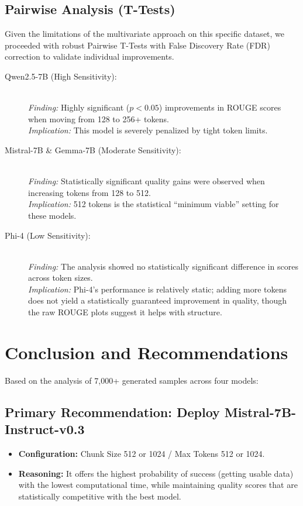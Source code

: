 \documentclass[12pt, a4paper]{article}
\begin{document}
\subsection{Pairwise Analysis (T-Tests)}
Given the limitations of the multivariate approach on this specific dataset, we proceeded with robust Pairwise T-Tests with False Discovery Rate (FDR) correction to validate individual improvements.

\begin{description}
    \item[Qwen2.5-7B (High Sensitivity):] \hfill \\
    \textit{Finding:} Highly significant ($p<0.05$) improvements in ROUGE scores when moving from 128 to 256+ tokens. \\
    \textit{Implication:} This model is severely penalized by tight token limits.

    \item[Mistral-7B \& Gemma-7B (Moderate Sensitivity):] \hfill \\
    \textit{Finding:} Statistically significant quality gains were observed when increasing tokens from 128 to 512. \\
    \textit{Implication:} 512 tokens is the statistical ``minimum viable'' setting for these models.

    \item[Phi-4 (Low Sensitivity):] \hfill \\
    \textit{Finding:} The analysis showed no statistically significant difference in scores across token sizes. \\
    \textit{Implication:} Phi-4's performance is relatively static; adding more tokens does not yield a statistically guaranteed improvement in quality, though the raw ROUGE plots suggest it helps with structure.
\end{description}

\section{Conclusion and Recommendations}
Based on the analysis of 7,000+ generated samples across four models:

\subsection*{Primary Recommendation: Deploy Mistral-7B-Instruct-v0.3}
\begin{itemize}
    \item \textbf{Configuration:} Chunk Size 512 or 1024 / Max Tokens 512 or 1024.
    \item \textbf{Reasoning:} It offers the highest probability of success (getting usable data) with the lowest computational time, while maintaining quality scores that are statistically competitive with the best model.
\end{itemize}
\end{document}
